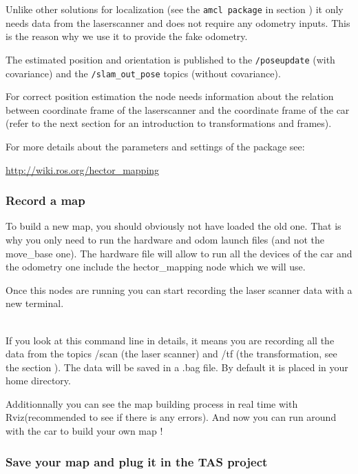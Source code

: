 Unlike other solutions for localization (see the \texttt{amcl package} in section ) it only needs data from the laserscanner and does not require any odometry inputs. This is the reason why we use it to provide the fake odometry.

The estimated position and orientation is published to the \texttt{/poseupdate} (with covariance) and the \texttt{/slam\_out\_pose} topics (without covariance). 
 
For correct position estimation the node needs information about the relation between coordinate frame of the laserscanner and the coordinate frame of the car (refer to the next section  for an introduction to transformations and frames).

For more details about the parameters and settings of the package see:

\hyperref[http://wiki.ros.org/hector_mapping]{http://wiki.ros.org/hector\_mapping}

\subsubsection{Record a map}

To build a new map, you should obviously not have loaded the old one. That is why you only need to run the hardware and odom launch files (and not the move\_base one). The hardware file will allow to run all the devices of the car and the odometry one include the hector\_mapping node which we will use.

Once this nodes are running you can start recording the laser scanner data with a new terminal.

 \\

If you look at this command line in details, it means you are recording all the data from the topics /scan (the laser scanner) and /tf (the transformation, see the section ). The data will be saved in a .bag file. By default it is placed in your home directory.

Additionnally you can see the map building process in real time with Rviz(recommended to see if there is any errors). And now you can run around with the car to build your own map !

\subsubsection{Save your map and plug it in the TAS project}

